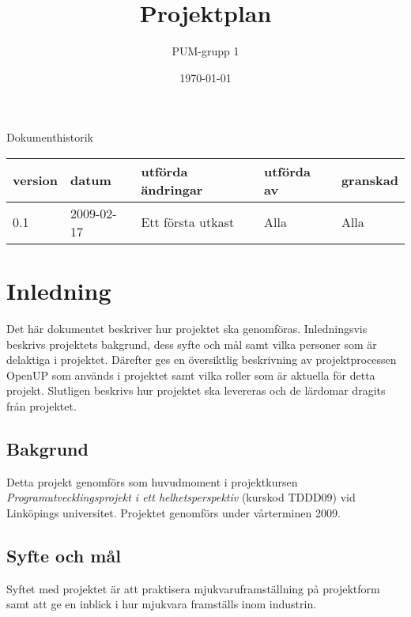 

\ifpdf
\else
\fi

\title{Projektplan}
\author{PUM-grupp 1}
\date{\today}



\maketitle\thispagestyle{empty}

\newpage

{\centering \Large{Dokumenthistorik\\}}

\vspace{10pt}
\begin{tabularx}{\textwidth}{ |l|l|X|l|l| }
  \hline
    \textbf{version} & \textbf{datum} & \textbf{utförda ändringar} & \textbf{utförda av} & \textbf{granskad} \\
	\hline 0.1 & 2009-02-17 & Ett första utkast & Alla & Alla \\
  \hline
\end{tabularx}

\newpage

\setcounter{tocdepth}{2}
\tableofcontents
\newpage

\section{Inledning}
Det här dokumentet beskriver hur projektet ska genomföras. Inledningsvis beskrivs projektets bakgrund, dess syfte och mål samt vilka personer som är delaktiga i projektet. Därefter ges en översiktlig beskrivning av projektprocessen OpenUP som används i projektet samt vilka roller som är aktuella för detta projekt. Slutligen beskrivs hur projektet ska levereras och de lärdomar dragits från projektet.

\subsection{Bakgrund}
Detta projekt genomförs som huvudmoment i projektkursen \textit{Programutvecklingsprojekt i ett helhetsperspektiv} (kurskod TDDD09) vid Linköpings universitet. Projektet genomförs under vårterminen 2009.

\subsection{Syfte och mål}
Syftet med projektet är att praktisera mjukvaruframställning på projektform samt att ge en inblick i hur mjukvara framställs inom industrin.


